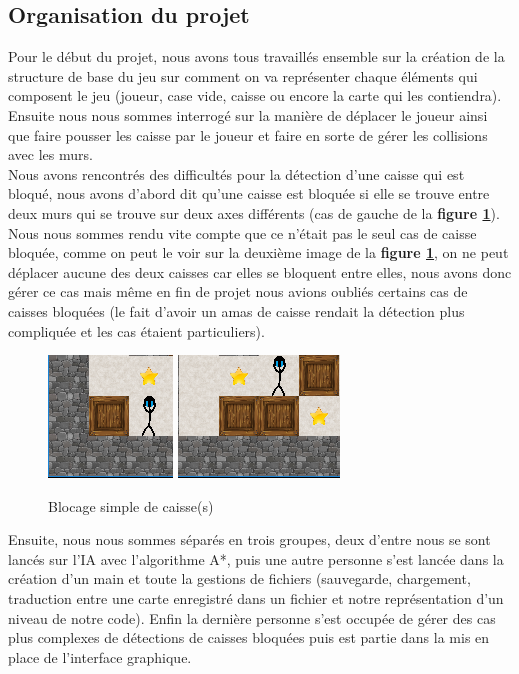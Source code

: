\documentclass[a4paper,12pt]{article} %
\begin{document}
\subsection{Organisation du projet}

Pour le début du projet, nous avons tous travaillés ensemble sur la création de la structure de base du jeu sur comment on va représenter chaque éléments qui composent le jeu (joueur, case vide, caisse ou encore la carte qui les contiendra). Ensuite nous nous sommes interrogé sur la manière de déplacer le joueur ainsi que faire pousser les caisse par le joueur et faire en sorte de gérer les collisions avec les murs.\\
Nous avons rencontrés des difficultés pour la détection d'une caisse qui est bloqué, nous avons d'abord dit qu'une caisse est bloquée si elle se trouve entre deux murs qui se trouve sur deux axes différents (cas de gauche de la \textbf{figure \ref{figure4}}). Nous nous sommes rendu vite compte que ce n'était pas le seul cas de caisse bloquée, comme on peut le voir sur la deuxième image de la \textbf{figure \ref{figure4}}, on ne peut déplacer aucune des deux caisses car elles se bloquent entre elles, nous avons donc gérer ce cas mais même en fin de projet nous avions oubliés certains cas de caisses bloquées (le fait d'avoir un amas de caisse rendait la détection plus compliquée et les cas étaient particuliers).

\begin{figure}[!h]
\centering
\includegraphics[scale=0.5]{images/Capture3.PNG}
\hspace{1cm}
\includegraphics[scale=0.5]{images/Capture4.png}
\caption{Blocage simple de caisse(s)}
\label{figure4}
\end{figure}

Ensuite, nous nous sommes séparés en trois groupes, deux d'entre nous se sont lancés sur l'IA avec l'algorithme A*, puis une autre personne s'est lancée dans la création d'un main et toute la gestions de fichiers (sauvegarde, chargement, traduction entre une carte enregistré dans un fichier et notre représentation d'un niveau de notre code). Enfin la dernière personne s'est occupée de gérer des cas plus complexes de détections de caisses bloquées puis est partie dans la mis en place de l'interface graphique.
\end{document}

